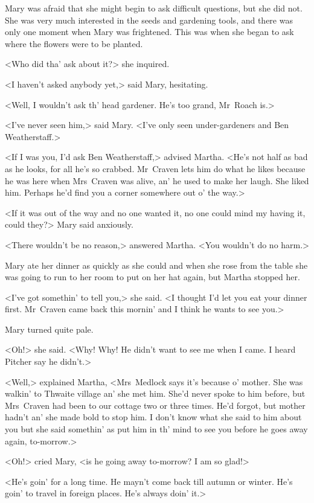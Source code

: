 Mary was afraid that she might begin to ask difficult questions, but she did not. She was very much interested in the seeds and gardening tools, and there was only one moment when Mary was frightened. This was when she began to ask where the flowers were to be planted.

<Who did tha' ask about it?> she inquired.

<I haven't asked anybody yet,> said Mary, hesitating.

<Well, I wouldn't ask th' head gardener. He's too grand, Mr~Roach is.>

<I've never seen him,> said Mary. <I've only seen under-gardeners and Ben Weatherstaff.>

<If I was you, I'd ask Ben Weatherstaff,> advised Martha. <He's not half as bad as he looks, for all he's so crabbed. Mr~Craven lets him do what he likes because he was here when Mrs~Craven was alive, an' he used to make her laugh. She liked him. Perhaps he'd find you a corner somewhere out o' the way.>

<If it was out of the way and no one wanted it, no one could mind my having it, could they?> Mary said anxiously.

<There wouldn't be no reason,> answered Martha. <You wouldn't do no harm.>

Mary ate her dinner as quickly as she could and when she rose from the table she was going to run to her room to put on her hat again, but Martha stopped her.

<I've got somethin' to tell you,> she said. <I thought I'd let you eat your dinner first. Mr~Craven came back this mornin' and I think he wants to see you.>

Mary turned quite pale.

<Oh!> she said. <Why! Why! He didn't want to see me when I came. I heard Pitcher say he didn't.>

<Well,> explained Martha, <Mrs~Medlock says it's because o' mother. She was walkin' to Thwaite village an' she met him. She'd never spoke to him before, but Mrs~Craven had been to our cottage two or three times. He'd forgot, but mother hadn't an' she made bold to stop him. I don't know what she said to him about you but she said somethin' as put him in th' mind to see you before he goes away again, to-morrow.>

<Oh!> cried Mary, <is he going away to-morrow? I am so glad!>

<He's goin' for a long time. He mayn't come back till autumn or winter. He's goin' to travel in foreign places. He's always doin' it.>


